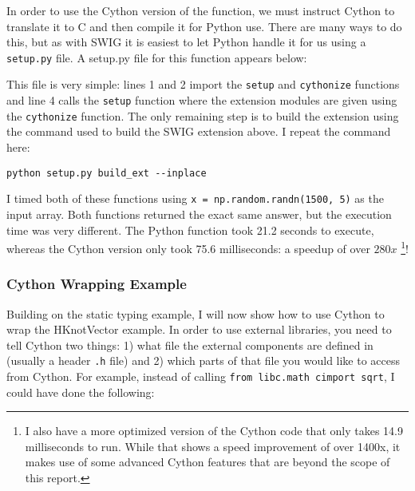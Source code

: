     \mainstretch{}
    \noindent In order to use the Cython version of the function, we must instruct Cython to translate it to C and then compile it for Python use. There are many ways to do this, but as with SWIG it is easiest to let Python handle it for us using a \texttt{setup.py} file. A setup.py file for this function appears below:

    \vspace{.2in}
    
    \mainstretch{}

    \noindent This file is very simple: lines 1 and 2 import the \texttt{setup} and \texttt{cythonize} functions and line 4 calls the \texttt{setup} function where the extension modules are given using the \texttt{cythonize} function. The only remaining step is to build the extension using the command used to build the SWIG extension above. I repeat the command here:

    \vspace{.2in}
    \begin{lstlisting}[numbers=none]
      python setup.py build_ext --inplace
    \end{lstlisting}
    \mainstretch{}

    \noindent I timed both of these functions using \texttt{x = np.random.randn(1500, 5)} as the input array. Both functions returned the exact same answer, but the execution time was very different. The Python function took 21.2 seconds to execute, whereas the Cython version only took 75.6 milliseconds: a speedup of over $280x$ \footnote{I also have a more optimized version of the Cython code that only takes 14.9 milliseconds to run. While that shows a speed improvement of over 1400x, it makes use of some advanced Cython features that are beyond the scope of this report.}!

  \subsubsection{Cython Wrapping Example} \label{ssub:cython_wrapping_example}

    Building on the static typing example, I will now show how to use Cython to wrap the HKnotVector example. In order to use external libraries, you need to tell Cython two things: 1) what file the external components are defined in (usually a header \texttt{.h} file) and 2) which parts of that file you would like to access from Cython. For example, instead of calling \texttt{from libc.math cimport sqrt}, I could have done the following:

